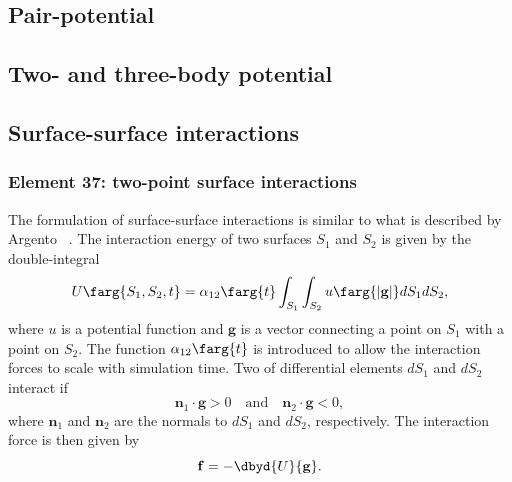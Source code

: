 \subsection{Pair-potential}

\subsection{Two- and three-body potential}

\subsection{Surface-surface interactions}
\subsubsection{Element 37: two-point surface interactions}
The formulation of surface-surface interactions is similar to what is described by Argento \etal~\cite{Jagota1997}. The interaction energy of two surfaces $S_1$ and $S_2$ is given by the double-integral
\begin{equation}
U\farg{S_1,S_2,t} = \alpha_{12}\farg{t} \int_{S_1} \int_{S_2} u\farg{\left| \mathbf{g} \right|} dS_1 dS_2,
\end{equation}
where $u$ is a potential function and $\mathbf{g}$ is a vector connecting a point on $S_1$ with a point on $S_2$. The function $\alpha_{12}\farg{t}$ is introduced to allow the interaction forces to scale with simulation time. Two of differential elements $dS_1$ and $dS_2$ interact if
\begin{equation}
\mathbf{n}_1 \cdot \mathbf{g} > 0 
\quad \textrm{and} \quad 
\mathbf{n}_2 \cdot \mathbf{g} < 0,
\end{equation}
where $\mathbf{n}_1$ and $\mathbf{n}_2$ are the normals to $dS_1$ and $dS_2$, respectively. The interaction force is then given by
\begin{equation}
\mathbf{f} = -\dbyd{U}{\mathbf{g}}.
\end{equation}

